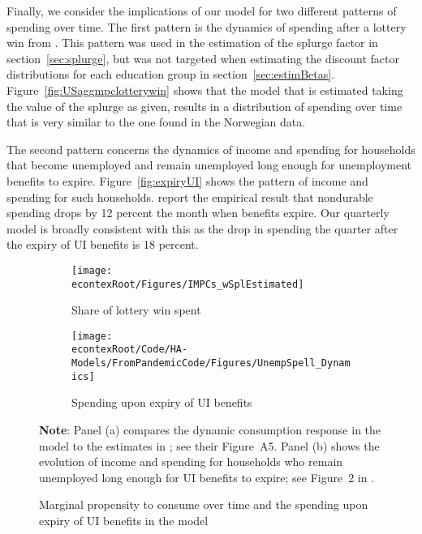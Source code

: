 \documentclass[\econtexRoot/HAFiscal]{subfiles}
\begin{document}
Finally, we consider the implications of our model for two different patterns of spending over time.
The first pattern is the dynamics of spending after a lottery win from \citeauthor{fagereng_mpc_2021}.
This pattern was used in the estimation of the splurge factor in section~\ref{sec:splurge}, but was not targeted when estimating the discount factor distributions for each education group in section~\ref{sec:estimBetas}.
Figure~\ref{fig:USaggmpclotterywin} shows that the model that is estimated taking the value of the splurge as given, results in a distribution of spending over time that is very similar to the one found in the Norwegian data.

\hypertarget{ganong-noel}{}

The second pattern concerns the dynamics of income and spending for households that become unemployed and remain unemployed long enough for unemployment benefits to expire.
Figure~\ref{fig:expiryUI} shows the pattern of income and spending for such households.
\citet{ganongConsumer2019} report the empirical result that nondurable spending drops by 12 percent the month when benefits expire.
Our quarterly model is broadly consistent with this as the drop in spending the quarter after the expiry of UI benefits is 18 percent.

\begin{figure}[htb]
    \centering
    \begin{subfigure}[b]{.48\linewidth}
        \centering
        \texttt{[image: \\econtexRoot/Figures/IMPCs\_wSplEstimated]}
        \caption{Share of lottery win spent}
        \notinsubfile{\label{fig:USaggmpclotterywin}}
    \end{subfigure}%
    \begin{subfigure}[b]{.48\linewidth}
        \centering
        \texttt{[image: \\econtexRoot/Code/HA-Models/FromPandemicCode/Figures/UnempSpell\_Dynamics]}
        \caption{Spending upon expiry of UI benefits}
        \notinsubfile{\label{fig:expiryUI}}
    \end{subfigure}
    \caption{Marginal propensity to consume over time and the spending upon expiry of UI benefits in the model}
    \notinsubfile{\label{fig:untargetedMoments}}
\begin{minipage}{16cm}
\small \vspace{.15cm} \textbf{Note}: Panel (a) compares the dynamic consumption response in the model to the estimates in {\citet{fagereng_mpc_2021}}; see their Figure~A5.
Panel (b) shows the evolution of income and spending for households who remain unemployed long enough for UI benefits to expire; see Figure~2 in {\citet{ganongConsumer2019}}.\normalsize
\end{minipage}
  \end{figure}
  
\end{document}
